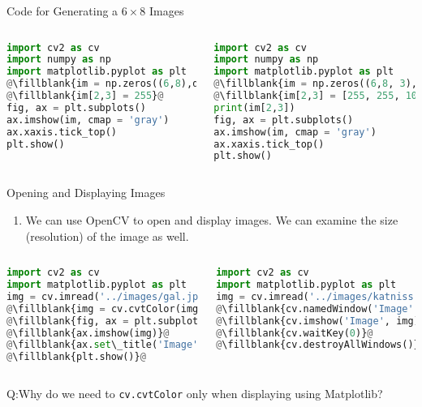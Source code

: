 \begin{frame}[fragile]{Code for Generating a $6\times 8$ Images}
\begin{columns}[t]
       \begin{lstlisting}[caption=A Grayscale Image, language=Python, escapechar=\@]
%matplotlib inline
import cv2 as cv
import numpy as np
import matplotlib.pyplot as plt
@\fillblank{im = np.zeros((6,8),dtype=np.uint8)}@
@\fillblank{im[2,3] = 255}@
fig, ax = plt.subplots()
ax.imshow(im, cmap = 'gray')
ax.xaxis.tick_top()
plt.show()
        \end{lstlisting}
       \begin{lstlisting}[caption=A Color Image,language=Python, escapechar=\@]
%matplotlib inline
import cv2 as cv
import numpy as np
import matplotlib.pyplot as plt
@\fillblank{im = np.zeros((6,8, 3),dtype=np.uint8)}@
@\fillblank{im[2,3] = [255, 255, 100]}@
print(im[2,3])
fig, ax = plt.subplots()
ax.imshow(im, cmap = 'gray')
ax.xaxis.tick_top()
plt.show()
         \end{lstlisting}
\end{columns}
\end{frame}




\begin{frame}[t, fragile]{Opening and Displaying  Images}
    \begin{enumerate}
      \item We can use OpenCV to open and display images. We can examine the size (resolution) of the image as well.
    \end{enumerate}
\begin{columns}[t]
       \begin{lstlisting}[caption=Displaying Using Matplotlib, language=Python, escapechar=\@]
%matplotlib inline
import cv2 as cv
import matplotlib.pyplot as plt
img = cv.imread('../images/gal.jpg', cv.IMREAD_COLOR)
@\fillblank{img = cv.cvtColor(img, cv.COLOR\_BGR2RGB)}@
@\fillblank{fig, ax = plt.subplots()}@
@\fillblank{ax.imshow(img)}@
@\fillblank{ax.set\_title('Image')}@
@\fillblank{plt.show()}@
        \end{lstlisting}
       \begin{lstlisting}[caption=Displaying Using OpenCV,language=Python, escapechar=\@]
import cv2 as cv
import matplotlib.pyplot as plt
img = cv.imread('../images/katniss.jpg', cv.IMREAD_COLOR)
@\fillblank{cv.namedWindow('Image', cv.WINDOW\_NORMAL)}@
@\fillblank{cv.imshow('Image', img)}@
@\fillblank{cv.waitKey(0)}@
@\fillblank{cv.destroyAllWindows()}@
         \end{lstlisting}
\end{columns}
Q:Why do we need to \lstinline!cv.cvtColor! only when displaying using Matplotlib?
\end{frame}



